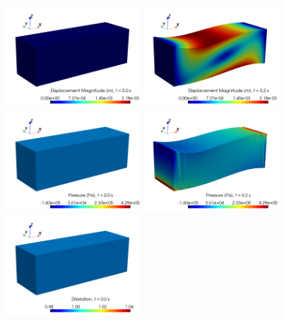 \documentclass{sfuthesis}
\numberwithin{equation}{section}
\numberwithin{figure}{chapter}
\numberwithin{table}{chapter}
\theoremstyle{definition}
\begin{document}
\begin{figure}
    \centering
    \includegraphics[width=0.45\textwidth]{convergence-space-disp-000.png}\hspace{2em}
    \includegraphics[width=0.45\textwidth]{convergence-space-disp-020.png}\\
    \includegraphics[width=0.45\textwidth]{convergence-space-pre-000.png}\hspace{2em}
    \includegraphics[width=0.45\textwidth]{convergence-space-pre-020.png}\\
    \includegraphics[width=0.45\textwidth]{convergence-space-dil-000.png}\hspace{2em}

\end{figure}
\end{document}
